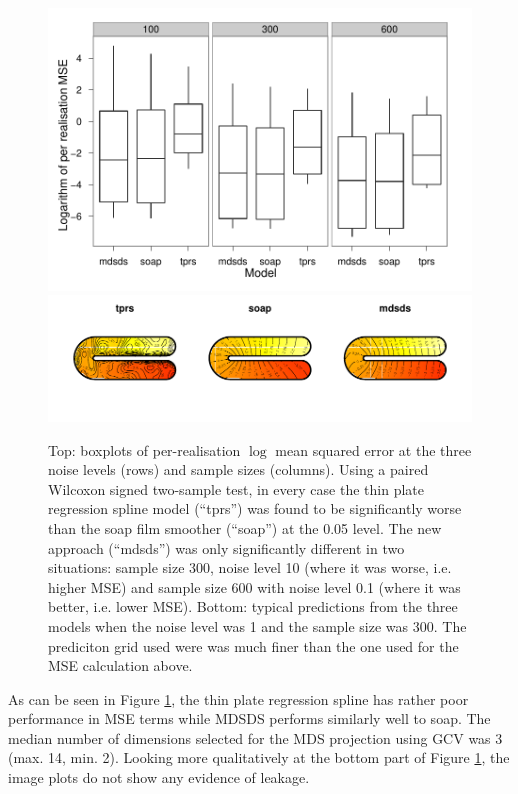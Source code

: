 \documentclass[useAMS,referee]{biom}
\begin{document}
\begin{figure}
\centering
\includegraphics[width=\textwidth]{examples/ramsay/ramsay-result.pdf} \\ \includegraphics[width=\textwidth]{examples/ramsay/ramsay-real.pdf}
\caption{Top: boxplots of per-realisation $\log$ mean squared error at the three noise levels (rows) and sample sizes (columns). Using a paired Wilcoxon signed two-sample test, in every case the thin plate regression spline model (``tprs'') was found to be significantly worse than the soap film smoother (``soap'') at the 0.05 level. The new approach (``mdsds'') was only significantly different in two situations: sample size 300, noise level 10 (where it was worse, i.e. higher MSE) and sample size 600 with noise level 0.1 (where it was better, i.e. lower MSE). Bottom: typical predictions from the three models when the noise level was 1 and the sample size was 300. The prediciton grid used were was much finer than the one used for the MSE calculation above.}
\label{ramsay-results}
\end{figure}

As can be seen in Figure \ref{ramsay-results}, the thin plate regression spline has rather poor performance in MSE terms while MDSDS performs similarly well to soap. The median number of dimensions selected for the MDS projection using GCV was 3 (max. 14, min. 2). Looking more qualitatively at the bottom part of Figure \ref{ramsay-results}, the image plots do not show any evidence of leakage.
\end{document}
